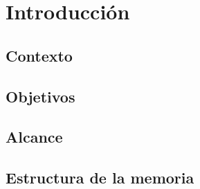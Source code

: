 \chapter{Introducción}
\label{cap:introduccion}

\section{Contexto}

\section{Objetivos}

\section{Alcance}

\section{Estructura de la memoria}
